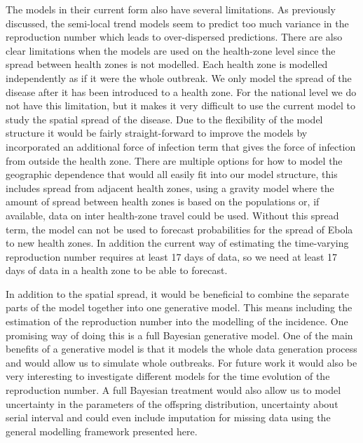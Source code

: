 \documentclass[12pt]{article}
\begin{document}
The models in their current form also have several limitations. As previously discussed, the semi-local trend models seem to predict too much variance in the reproduction number which leads to over-dispersed predictions. There are also clear limitations when the models are used on the health-zone level since the spread between health zones is not modelled. Each health zone is modelled independently as if it were the whole outbreak. We only model the spread of the disease after it has been introduced to a health zone. For the national level we do not have this limitation, but it makes it very difficult to use the current model to study the spatial spread of the disease. Due to the flexibility of the model structure it would be fairly straight-forward to improve the models by incorporated an additional force of infection term that gives the force of infection from outside the health zone. There are multiple options for how to model the geographic dependence that would all easily fit into our model structure, this includes spread from adjacent health zones, using a gravity model where the amount of spread between health zones is based on the populations \cite{haynesGravitySpatialInteraction1985} or, if available, data on inter health-zone travel could be used. Without this spread term, the model can not be used to forecast probabilities for the spread of Ebola to new health zones. In addition the current way of estimating the time-varying reproduction number requires at least 17 days of data, so we need at least 17 days of data in a health zone to be able to forecast.

In addition to the spatial spread, it would be beneficial to combine the separate parts of the model together into one generative model. This means including the estimation of the reproduction number into the modelling of the incidence. One promising way of doing this is a full Bayesian generative model. One of the main benefits of a generative model is that it models the whole data generation process and would allow us to simulate whole outbreaks. For future work it would also be very interesting to investigate different models for the time evolution of the reproduction number. A full Bayesian treatment would also allow us to model uncertainty in the parameters of the offspring distribution, uncertainty about serial interval and could even include imputation for missing data using the general modelling framework presented here.
\end{document}
